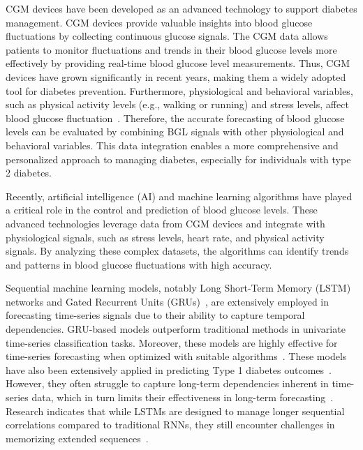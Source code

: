 CGM devices have been developed as an advanced technology to support diabetes management. CGM devices provide valuable insights into blood glucose fluctuations by collecting continuous glucose signals. The CGM data allows patients to monitor fluctuations and trends in their blood glucose levels more effectively by providing real-time blood glucose level measurements. Thus, CGM devices have grown significantly in recent years, making them a widely adopted tool for diabetes prevention. Furthermore, physiological and behavioral variables, such as physical activity levels (e.g., walking or running) and stress levels, affect blood glucose fluctuation~\cite{shuvo2023deep}. Therefore, the accurate forecasting of blood glucose levels can be evaluated by combining BGL signals with other physiological and behavioral variables. This data integration enables a more comprehensive and personalized approach to managing diabetes, especially for individuals with type 2 diabetes.

Recently, artificial intelligence (AI) and machine learning algorithms have played a critical role in the control and prediction of blood glucose levels. These advanced technologies leverage data from CGM devices and integrate with physiological signals, such as stress levels, heart rate, and physical activity signals. By analyzing these complex datasets, the algorithms can identify trends and patterns in blood glucose fluctuations with high accuracy.


Sequential machine learning models, notably Long Short-Term Memory (LSTM) networks and Gated Recurrent Units (GRUs)~\cite{chung2014empirical}, are extensively employed in forecasting time-series signals due to their ability to capture temporal dependencies. GRU-based models outperform traditional methods in univariate time-series classification tasks\cite{Elsayed_2019}. Moreover, these models are highly effective for time-series forecasting when optimized with suitable algorithms~\cite{makinde2024optimizingtimeseriesforecasting}. These models have also been extensively applied in predicting Type 1 diabetes outcomes~\cite{patil2024modeling}. However, they often struggle to capture long-term dependencies inherent in time-series data, which in turn limits their effectiveness in long-term forecasting~\cite{kim2024comprehensive}. Research indicates that while LSTMs are designed to manage longer sequential correlations compared to traditional RNNs, they still encounter challenges in memorizing extended sequences~\cite{kong2024unlocking}.

